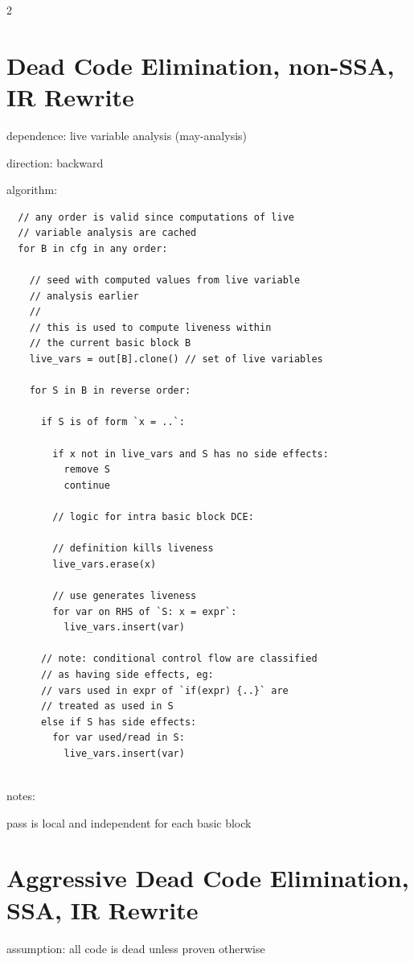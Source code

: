 \documentclass[8pt]{extarticle}
\begin{document}
\begin{multicols*}{2}
  \vfill\null
  \columnbreak

  \section{Dead Code Elimination, non-SSA, IR Rewrite}

  dependence: live variable analysis (may-analysis)

  direction: backward

  algorithm:

  \begin{verbatim}
  // any order is valid since computations of live
  // variable analysis are cached
  for B in cfg in any order:

    // seed with computed values from live variable
    // analysis earlier
    //
    // this is used to compute liveness within
    // the current basic block B
    live_vars = out[B].clone() // set of live variables

    for S in B in reverse order:

      if S is of form `x = ..`:

        if x not in live_vars and S has no side effects:
          remove S
          continue

        // logic for intra basic block DCE:

        // definition kills liveness
        live_vars.erase(x)

        // use generates liveness
        for var on RHS of `S: x = expr`:
          live_vars.insert(var)

      // note: conditional control flow are classified
      // as having side effects, eg:
      // vars used in expr of `if(expr) {..}` are
      // treated as used in S
      else if S has side effects:
        for var used/read in S:
          live_vars.insert(var)
          
  \end{verbatim}

  notes:

  pass is local and independent for each basic block
  
  \vfill\null
  \columnbreak

  \section{Aggressive Dead Code Elimination, SSA, IR Rewrite}

  assumption: all code is dead unless proven otherwise
  

\end{multicols*}
\end{document}
